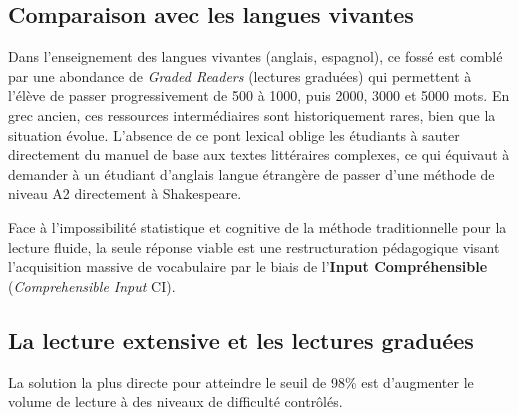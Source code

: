 {\subsection{Comparaison avec les langues vivantes}

Dans l'enseignement des langues vivantes (anglais, espagnol), ce fossé est comblé par une abondance
de \textit{Graded Readers} (lectures graduées) qui permettent à l'élève de passer progressivement de
500 à 1000, puis 2000, 3000 et 5000 mots. En grec ancien, ces ressources intermédiaires sont
historiquement rares, bien que la situation évolue. L'absence de ce \og pont\fg{} lexical oblige les
étudiants à sauter directement du manuel de base aux textes littéraires complexes, ce qui équivaut à
demander à un étudiant d'anglais langue étrangère de passer d'une méthode de niveau A2 directement à
Shakespeare.\cite{II-3-2-ref50}

Face à l'impossibilité statistique et cognitive de la méthode traditionnelle pour la lecture fluide,
la seule réponse viable est une restructuration pédagogique visant l'acquisition massive de
vocabulaire par le biais de l'\textbf{Input Compréhensible} (\textit{Comprehensible Input} \- CI).



\subsection{La lecture extensive et les lectures graduées}

La solution la plus directe pour atteindre le seuil de 98\% est d'augmenter le volume de lecture à
des niveaux de difficulté contrôlés.

}
